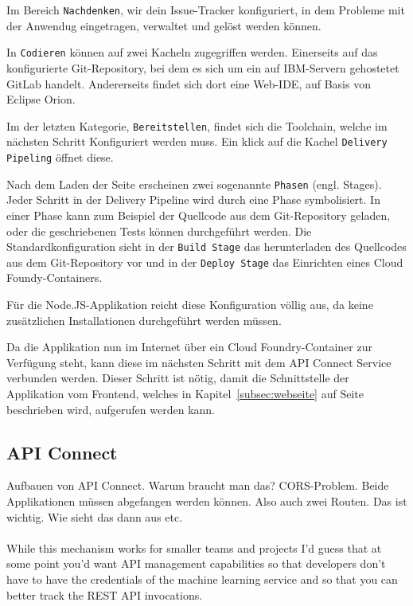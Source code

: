 Im Bereich \texttt{Nachdenken}, wir dein Issue-Tracker konfiguriert, in dem Probleme mit der Anwendug eingetragen, verwaltet
und gelöst werden können.

In \texttt{Codieren} können auf zwei Kacheln zugegriffen werden. Einerseits auf das konfigurierte Git-Repository, bei dem
es sich um ein auf IBM-Servern gehostetet GitLab handelt. Andererseits findet sich dort eine Web-IDE, auf Basis von
Eclipse Orion.

Im der letzten Kategorie, \texttt{Bereitstellen}, findet sich die Toolchain, welche im nächsten Schritt Konfiguriert werden
muss. Ein klick auf die Kachel \texttt{Delivery Pipeling} öffnet diese.

Nach dem Laden der Seite erscheinen zwei sogenannte \texttt{Phasen} (engl. Stages). Jeder Schritt in der Delivery Pipeline
wird durch eine Phase symbolisiert. In einer Phase kann zum Beispiel der Quellcode aus dem Git-Repository geladen, oder
die geschriebenen Tests können durchgeführt werden. Die Standardkonfiguration sieht in der \texttt{Build Stage} das
herunterladen des Quellcodes aus dem Git-Repository vor und in der \texttt{Deploy Stage} das Einrichten eines Cloud
Foundy-Containers.

Für die Node.JS-Applikation reicht diese Konfiguration völlig aus, da keine zusätzlichen Installationen durchgeführt
werden müssen.

Da die Applikation nun im Internet über ein Cloud Foundry-Container zur Verfügung steht, kann diese im nächsten Schritt
mit dem API Connect Service verbunden werden. Dieser Schritt ist nötig, damit die Schnittstelle der Applikation vom
Frontend, welches in Kapitel~\ref{subsec:webseite} auf Seite~\pageref{subsec:webseite} beschrieben wird, aufgerufen werden
kann.

\subsection{API Connect}
Aufbauen von API Connect. Warum braucht man das? CORS-Problem. Beide Applikationen müssen abgefangen werden können. Also
auch zwei Routen. Das ist wichtig. Wie sieht das dann aus etc.
\\ \\
While this mechanism works for smaller teams and projects I’d guess that at some point you’d want API management
capabilities so that developers don’t have to have the credentials of the machine learning service and so that you can
better track the REST API invocations.